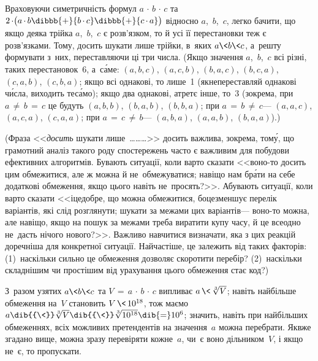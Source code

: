 Враховуючи симетричність формул \nolinebreak[3] ${a\,{\cdot}\,b\,{\cdot}\,c}$ та ${2\,{\cdot}\bigl(a\,{\cdot}\,b}\dibbb{{+}}{b\,{\cdot}\,c}\dibbb{{+}}{c\,{\cdot}\,a}\bigr)$ відносно $a$,~$b$,~$c$, легко бачити, що якщо деяка трійка $a$,~$b$,~$c$ є розв'язком, то й усі її перестановки теж є розв'язками. 
Тому, досить шукати лише трійки, в~яких ${a\<b\<c}$, а~решту формувати з~них, переставляючи ці три числа. 
(Якщо значення $a$,~$b$,~$c$ всі різні, таких 
перестановок~6, 
а~с\'{а}ме:
$(a,b,c)$,
$(a,c,b)$,
$(b,a,c)$,
$(b,c,a)$,
$(c,a,b)$,
$(c,b,a)$;
якщо всі однакові, то лише~1 (як\nolinebreak[3] не\nolinebreak[3] переставляй однакові ч\'{и}сла, виходить те\nolinebreak[3] с\'{а}мо); 
якщо два однакові, а\nolinebreak[3] третє інше, 
то~3 (зокрема, 
при $a\,{\neq}\,b\,{=}\,c$ це будуть
$(a,b,b)$,
$(b,a,b)$,
$(b,b,a)$;\hspace{0.5 em plus 1em}
при $a\,{=}\,b\,{\neq}\,c$\nolinebreak[3] --- 
$(a,a,c)$,
$(a,c,a)$,
$(c,a,a)$;\hspace{0.5 em plus 1em}
при $a\,{=}\,c\,{\neq}\, b$\nolinebreak[3] --- 
$(a,b,a)$,
$(a,a,b)$,
$(b,a,a)$).)

\noindent\hrulefill

\noindent
(Фраза <<\emph{досить} шукати лише~\dots\dots\dots>> досить важлива, зокрема, том\'{у}, що грамотний аналіз такого роду спостережень часто є важливим для побудови ефективних алгоритмів. Бувають ситуації, коли варто сказати <<воно-то досить цим обмежитися, але ж можна й не~обмежуватися; навіщо нам бр\'{а}ти на себе додаткові обмеження, якщо цього навіть не~просять?>>. А\nolinebreak[3] бувають  ситуації, коли варто сказати <<і\nolinebreak[3] це\nolinebreak[3] добре, що можна обмежитися, бо\nolinebreak[3] це\nolinebreak[3] зменшує перелік варіантів, які слід розглянути; шукати за межами цих варіантів\nolinebreak[3] --- воно-то можна, але навіщо, якщо на пошук за межами треба виратити купу часу, й це все\nolinebreak[3] одно не~дасть нічого нового?>>. Важливо навчитися визначати, яка з цих реакцій доречніша для конкретної ситуації. Найчастіше, це залежить від таких факторів: (1)~наскільки сильно це обмеження дозволяє скоротити перебір? (2)~наскільки складнішим чи простішим від урахування цього обмеження стає код?)

\noindent\hrulefill

З~разом узятих ${a\<b\<c}$ та ${V\,{=}\,a\,{\cdot}\,b\,{\cdot}\,c}$ випливає ${a\,{\<}\,\sqrt[3]{V}}$; навіть найбільше обмеження на~$V$ становить $V\,{\<}\,10^{18}$, тож маємо ${a\dib{{\<}}\sqrt[3]{V}\dib{{\<}}\sqrt[3]{10^{18}}\dib{{=}}10^6}$; значить, навіть при найбільших обмеженнях, всіх можливих претендентів на значення~$a$ можна перебрати. Як\nolinebreak[3] вже згадано вище, можна зразу перевіряти кожне~$a$, чи~є воно дільником~$V$, і якщо не~є, то пропускати.


